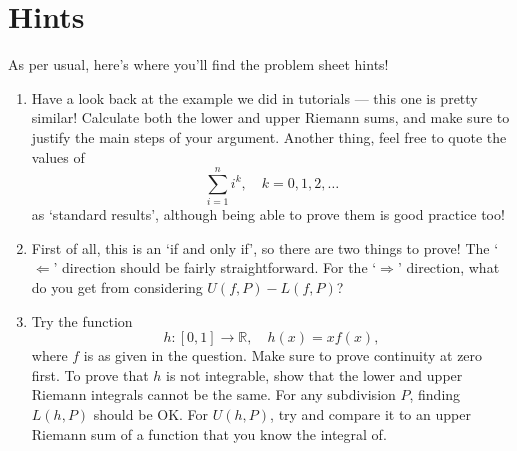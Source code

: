 \documentclass[
  10pt,
  a4paper]{article}
\providecommand{\tightlist}{%
  \setlength{\itemsep}{0pt}\setlength{\parskip}{0pt}}
\theoremstyle{plain}
\theoremstyle{definition}
\theoremstyle{plain}
\theoremstyle{plain}
\theoremstyle{plain}
\theoremstyle{plain}
\theoremstyle{definition}
\theoremstyle{definition}
\theoremstyle{remark}
\theoremstyle{remark}
\begin{document}
\hypertarget{hints}{%
\section{Hints}\label{hints}}

As per usual, here's where you'll find the problem sheet hints!

\begin{enumerate}
\def\labelenumi{\arabic{enumi})}
\tightlist
\item
  Have a look back at the example we did in tutorials --- this one is pretty similar! Calculate both the lower and upper Riemann sums, and make sure to justify the main steps of your argument. Another thing, feel free to quote the values of \[\sum_{i=1}^{n} i^{k}, \quad k=0,1,2,\ldots\] as `standard results', although being able to prove them is good practice too!
\item
  First of all, this is an `if and only if', so there are two things to prove! The `\(\Leftarrow\)' direction should be fairly straightforward. For the `\(\Rightarrow\)' direction, what do you get from considering \(U(f,P) - L(f,P)\)?
\item
  Try the function \[h:[0,1] \to \mathbb{R}, \quad h(x) = xf(x),\] where \(f\) is as given in the question. Make sure to prove continuity at zero first. To prove that \(h\) is not integrable, show that the lower and upper Riemann integrals cannot be the same. For any subdivision \(P\), finding \(L(h,P)\) should be OK. For \(U(h,P)\), try and compare it to an upper Riemann sum of a function that you know the integral of.
\end{enumerate}
\end{document}
